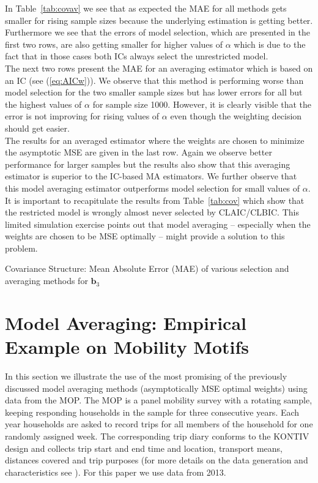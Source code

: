 \documentclass[12pt, a4paper]{article}
\numberwithin{defcounter}{section}
\numberwithin{excounter}{section}
\begin{document}
In Table~\ref{tab:covav} we see that as expected the \ac{MAE} for all methods gets smaller for rising sample sizes because the underlying estimation is getting better. Furthermore we see that the errors of model selection, which are presented in the first two rows, are also getting smaller for higher values of $\alpha$ which is due to the fact that in those cases both \ac{IC}s always select the unrestricted model. 
\\
The next two rows present the \ac{MAE} for an averaging estimator which is based on an \ac{IC} (see (\ref{eq:AICw})). We observe that this method is performing worse than model selection for the two smaller sample sizes but has lower errors for all but the highest values of $\alpha$ for sample size 1000. However, it is clearly visible that the error is not improving for rising values of $\alpha$ even though the weighting decision should get easier. 
\\
The results for an averaged estimator where the weights are chosen to minimize the asymptotic \ac{MSE} are given in the last row. Again we observe better performance for larger samples but the results also show that this averaging estimator is superior to the \ac{IC}-based \ac{MA} estimators. We further observe that this model averaging estimator outperforms model selection for small values of $\alpha$. It is important to recapitulate the results from Table~\ref{tab:cov} which show that the restricted model is wrongly almost never selected by \ac{CLAIC}/\ac{CLBIC}. This limited simulation exercise points out that model averaging -- especially when the weights are chosen to be \ac{MSE} optimally -- might provide a solution to this problem. 



\begin{table}[H]
\centering
\caption{Covariance Structure: Mean Absolute Error (MAE) of various selection and averaging methods for $\textbf{b}_3$}

\label{tab:covav}
\end{table}


\section{Model Averaging: Empirical Example on Mobility Motifs}

\label{case}
In this section we illustrate the use of the most promising of the previously discussed model averaging methods (asymptotically \ac{MSE} optimal weights) using data from the \ac{MOP}.  
The \ac{MOP} is a panel mobility survey with a rotating sample, keeping responding 
households in the sample for three consecutive years. Each year households are 
asked to record trips for all members of the household for one randomly assigned 
week. The corresponding trip diary conforms to the KONTIV design and 
collects trip start and end time and location, transport means, distances covered and trip purposes (for more details on the data generation and characteristics  see \citep{zumkeller2009}). 
For this paper we use data from 2013. 
\end{document}

